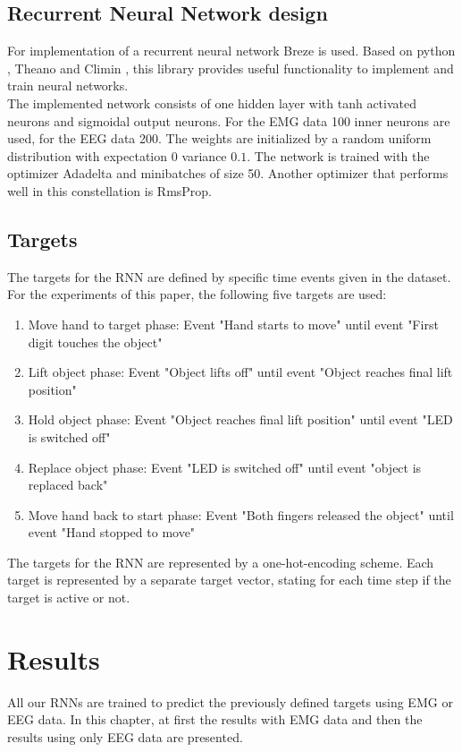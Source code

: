 \documentclass{article} %
\begin{document}
\subsection{Recurrent Neural Network design}
For implementation of a recurrent neural network Breze \cite{breze} is used. Based on python \cite{python}, Theano \cite{theano} and Climin \cite{climin}, this library provides useful functionality to implement and train neural networks.\\
The implemented network consists of one hidden layer with tanh activated neurons and sigmoidal output neurons. For the EMG data 100 inner neurons are used, for the EEG data 200. The weights are initialized by a random uniform distribution with  expectation $0$ variance $0.1$. The network is trained with the optimizer Adadelta and minibatches of size 50. Another optimizer that performs well in this constellation is RmsProp.


\subsection{Targets}
The targets for the RNN are defined by specific time events given in the dataset. For the experiments of this paper, the following five targets are used:
\begin{enumerate}
	\item Move hand to target phase: Event "Hand starts to move"  until event "First digit touches the object"
	\item Lift object phase: Event "Object lifts off" until event "Object reaches final lift position"
	\item Hold object phase: Event "Object reaches final lift position" until event "LED is switched off"
	\item Replace object phase: Event "LED is switched off" until event "object is replaced back"
	\item Move hand back to start phase: Event "Both fingers released the object" until event "Hand stopped to move"
\end{enumerate}
The targets for the RNN are represented by a one-hot-encoding scheme. Each target is represented by a separate target vector, stating for each time step if the target is active or not.

\section{Results}
All our RNNs are trained to predict the previously defined targets using EMG or EEG data. In this chapter, at first the results with EMG data and then the results using only EEG data are presented.
\end{document}
